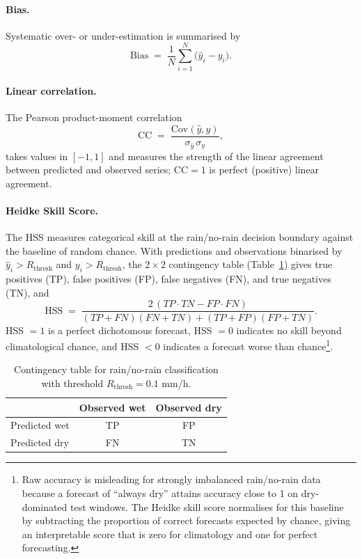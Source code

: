 \documentclass[12pt, a4paper]{article}
\begin{document}
\paragraph{Bias.} Systematic over- or under-estimation is summarised
by
\begin{equation}
  \mathrm{Bias} \;=\;
  \frac{1}{N}\sum_{i=1}^{N}\bigl(\hat{y}_i - y_i\bigr). \label{eq:bias}
\end{equation}

\paragraph{Linear correlation.} The Pearson product-moment correlation
\begin{equation}
  \mathrm{CC} \;=\;
  \frac{\mathrm{Cov}\!\left(\hat{y}, y\right)}
       {\sigma_{\hat{y}}\,\sigma_{y}}, \label{eq:cc}
\end{equation}
takes values in \([-1, 1]\) and measures the strength of the linear
agreement between predicted and observed series; \(\mathrm{CC}=1\) is
perfect (positive) linear agreement.

\paragraph{Heidke Skill Score.} The HSS measures categorical skill at
the rain/no-rain decision boundary against the baseline of random
chance. With predictions and observations binarised by
\(\hat{y}_i > R_{\text{thresh}}\) and \(y_i > R_{\text{thresh}}\), the
\(2\times 2\) contingency table (Table~\ref{tab:contingency}) gives
true positives (TP), false positives (FP), false negatives (FN), and
true negatives (TN), and
\begin{equation}
  \mathrm{HSS} \;=\;
  \frac{2\,(TP\cdot TN - FP\cdot FN)}
       {(TP+FN)(FN+TN) + (TP+FP)(FP+TN)}. \label{eq:hss}
\end{equation}
HSS \(=1\) is a perfect dichotomous forecast, HSS \(=0\) indicates no
skill beyond climatological chance, and HSS \(<0\) indicates a
forecast worse than chance\footnote{Raw accuracy is misleading for
strongly imbalanced rain/no-rain data because a forecast of ``always
dry'' attains accuracy close to 1 on dry-dominated test windows. The
Heidke skill score normalises for this baseline by subtracting the
proportion of correct forecasts expected by chance, giving an
interpretable score that is zero for climatology and one for perfect
forecasting.}.

\begin{table}[h]
\centering
\caption{Contingency table for rain/no-rain classification with
threshold $R_{\text{thresh}} = 0.1$ mm/h.}
\label{tab:contingency}
\begin{tabular}{lcc}
\toprule
                 & Observed wet & Observed dry \\
\midrule
Predicted wet    & TP           & FP           \\
Predicted dry    & FN           & TN           \\
\bottomrule
\end{tabular}
\end{table}
\end{document}
